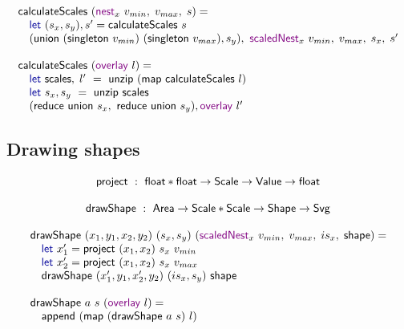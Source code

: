 \documentclass{jfp}
\newcommand{\ident}[1]{\textnormal{\textcolor{idclr}{\sffamily #1}}}
\newcommand{\kvd}[1]{\textnormal{\textcolor{kvdclr}{\sffamily #1}}}
\newcommand{\fkvd}[1]{\textnormal{\textcolor{fkvdclr}{\sffamily #1}}}
\begin{document}
\begin{equation*}
\begin{array}{l}
\ident{calculateScales}~(\kvd{nest}_x~v_{min},\;v_{max},\;s) = \\
\quad\fkvd{let}~(s_x, s_y),s' = \ident{calculateScales}~s\\
\quad(\ident{union}~(\ident{singleton}~v_{min})~(\ident{singleton}~v_{max}), s_y),~\kvd{scaledNest}_x~v_{min},\;v_{max},\;s_x,\;s'\\
\\
\ident{calculateScales}~(\kvd{overlay}~l) = \\
\quad\fkvd{let}~\ident{scales},\;l'~=~\ident{unzip}~(\ident{map}~\ident{calculateScales}~l)\\
\quad\fkvd{let}~s_x,s_y~=~\ident{unzip}~\ident{scales}\\
\quad(\ident{reduce}~\ident{union}~s_x,~\ident{reduce}~\ident{union}~s_y), \kvd{overlay}~l'
\end{array}
\end{equation*}

\subsection{Drawing shapes}

\begin{equation*}
\ident{project}~:~\ident{float}*\ident{float}\rightarrow \ident{Scale}\rightarrow\ident{Value} \rightarrow \ident{float}
\end{equation*}

\begin{equation*}
\ident{drawShape}~:~\ident{Area} \rightarrow \ident{Scale}*\ident{Scale}\rightarrow\ident{Shape}\rightarrow\ident{Svg}
\end{equation*}

\begin{equation*}
\begin{array}{l}
\ident{drawShape}~(x_1, y_1, x_2, y_2)~(s_x, s_y)~(\kvd{scaledNest}_x~v_{min},\;v_{max},\;{is}_x,\;\ident{shape}) = \\
\quad\fkvd{let}~x_1' = \ident{project}~(x_1, x_2)~s_x~v_{min}\\
\quad\fkvd{let}~x_2' = \ident{project}~(x_1, x_2)~s_x~v_{max}\\
\quad\ident{drawShape}~(x_1', y_1, x_2', y_2)~({is}_x, s_y)~\ident{shape}\\
\\
\ident{drawShape}~a~s~(\kvd{overlay}~l) = \\
\quad\ident{append}~(\ident{map}~(\ident{drawShape}~a~s)~l)

\end{array}
\end{equation*}
\end{document}
